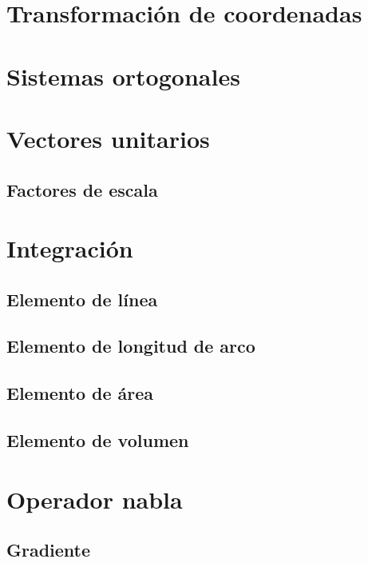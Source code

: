 \documentclass[12pt, fleqn]{report}                             %
\theoremstyle{break}                                            %
\begin{document}
        \section{Transformación de coordenadas}
        
        \section{Sistemas ortogonales}
        
        \section{Vectores unitarios}
        
            \subsection{Factores de escala}
        
        \section{Integración}
        
            \subsection{Elemento de línea}
            
            \subsection{Elemento de longitud de arco}
            
            \subsection{Elemento de área}
            
            \subsection{Elemento de volumen}
            
        \section{Operador nabla}
        
            \subsection{Gradiente}
            
\end{document}
